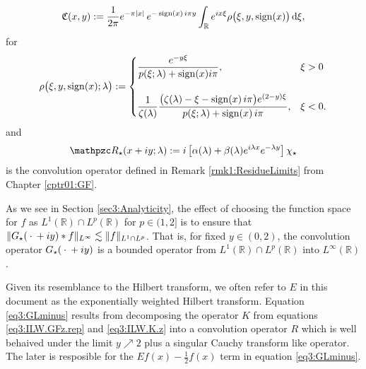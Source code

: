 \documentclass[../dissertation.tex]{subfiles}
\begin{document}
\begin{thm}
	\begin{align}\label{eq3:GFcont}
		\mathfrak C(x,y)
			:= \frac{1}{2\pi} e^{-\pi|x|} \, e^{- \operatorname{sign}(x) \, i \pi y }
				\int_{\mathbb R} e^{ix \xi} \rho\big(\xi, y, \operatorname{sign}(x)\big) \, \mathrm{d}\xi,
	\end{align}
	for
	\begin{align}\label{eq0:smallR}
		\rho\big(\xi, y, \operatorname{sign}(x); \lambda\big)
			:= 	
				\begin{cases}
					\dfrac{e^{-y\xi}}{p(\xi; \lambda) + \operatorname{sign}(x) i\pi}, & \xi > 0\\
					\\
					\dfrac{1}{\zeta(\lambda)} 
					\dfrac{\big(\zeta(\lambda)- \xi - \operatorname{sign}(x) \, i\pi \big)e^{(2-y)\xi} }
							{p(\xi; \lambda) + \operatorname{sign}(x) \, i\pi},
						&	\xi < 0.
				\end{cases}
	\end{align}
	and
	\begin{align}
		\mathpzc R_\star (x+iy; \lambda) 
			:= i 
				\left[
					\alpha(\lambda) 
					+ \beta(\lambda) e^{i\lambda x}e^{-\lambda y}
				\right] \chi_\star
	\end{align}
	is the convolution operator defined in Remark \ref{rmk1:ResidueLimits} from 
	Chapter \ref{cptr01:GF}.
\end{thm}

\begin{rmk}
	As we see in Section \ref{sec3:Analyticity}, the effect of choosing the 
	function space for $f$
	as $L^1(\mathbb R) \cap L^p(\mathbb R)$ for $p\in (1, 2]$ is to ensure that 
	$\|G_\star(\kern 0.5ex \cdot \kern 0.5ex + iy) *f \|_{L^\infty} \lesssim \|f\|_{L^1\cap L^p}$. That is, 
	for fixed $y \in (0, 2)$, the convolution operator $G_\star(\kern 0.5ex \cdot \kern 0.5ex+iy)$ is 
	a bounded operator from $L^1(\mathbb R) \cap L^p(\mathbb R)$ into 
	$L^\infty(\mathbb R)$.
\end{rmk}

Given its resemblance to the Hilbert transform, we often refer to $E$ in this 
document as the exponentially weighted Hilbert transform. Equation 
\eqref{eq3:GLminus} results from decomposing the operator $K$ from equations 
\eqref{eq3:ILW.GFz.rep} and \eqref{eq3:ILW.K.z} into a convolution operator 
$R$ which is well behaived under the limit $y\nearrow 2$ plus a singular Cauchy 
transform like operator. The later is resposible for the 
$Ef(x) - \frac{1}{2} f(x)$ term in equation \eqref{eq3:GLminus}.
\end{document}
